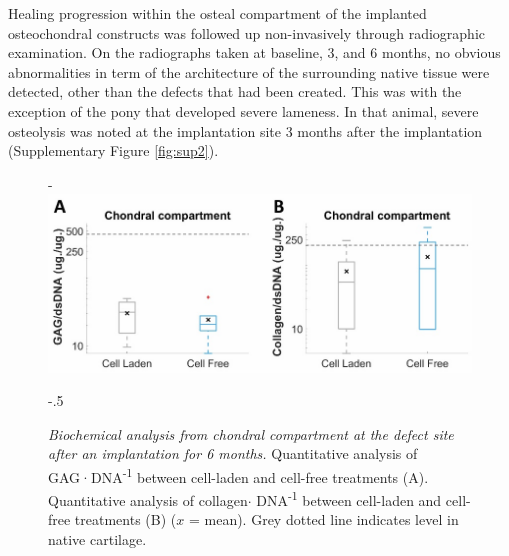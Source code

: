 \documentclass[twocolumn, empirical, authordate, issue]{jote-new-article}
\begin{document}
Healing progression within the osteal compartment of the implanted osteochondral constructs was followed up non-invasively through radiographic examination. On the radiographs taken at baseline, 3, and 6 months, no obvious abnormalities in term of the architecture of the surrounding native tissue were detected, other than the defects that had been created. This was with the exception of the pony that developed severe lameness. In that animal, severe osteolysis was noted at the implantation site 3 months after the implantation (Supplementary Figure \ref{fig:sup2}).
\begin{figure}[t!]


\captionsetup{width=\dimexpr \linewidth + \fullwidthlen\relax}

\begin{adjustwidth}{-\fullwidthlen}{}
\includegraphics[width=\columnwidth+\fullwidthlen]{media/image8.jpg}

\end{adjustwidth}
\begin{adjustwidth}{-.5\fullwidthlen}{}

\caption{\emph{Biochemical analysis from chondral compartment at the defect site after an implantation for 6 months.} Quantitative analysis of GAG·DNA\textsuperscript{-1} between cell-laden and cell-free treatments (A). Quantitative analysis of collagen$\cdot$ DNA\textsuperscript{-1} between cell-laden and cell-free treatments (B) ($x$ = mean). Grey dotted line indicates level in native cartilage.}
\label{fig:figure8}
\end{adjustwidth}
\end{figure}
\end{document}
